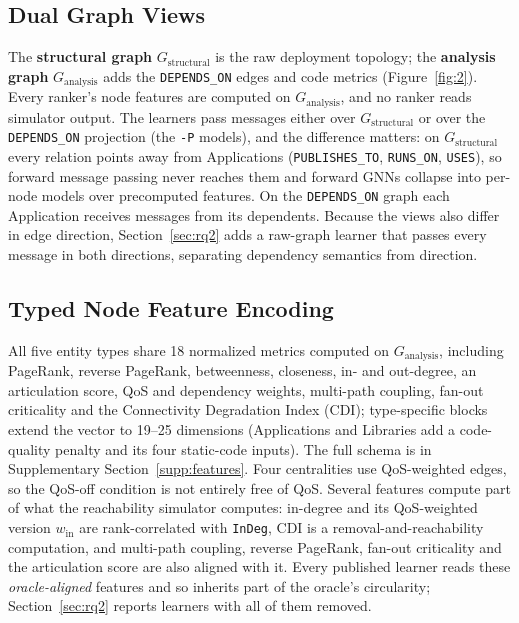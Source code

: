 \subsection{Dual Graph Views}
\label{sec:3.4}

The \textbf{structural graph} $G_{\text{structural}}$ is the raw deployment topology; the \textbf{analysis graph} $G_{\text{analysis}}$ adds the \texttt{DEPENDS\_ON} edges and code metrics (Figure~\ref{fig:2}). Every ranker's node features are computed on $G_{\text{analysis}}$, and no ranker reads simulator output. The learners pass messages either over $G_{\text{structural}}$ or over the \texttt{DEPENDS\_ON} projection (the \texttt{-P} models), and the difference matters: on $G_{\text{structural}}$ every relation points away from Applications (\texttt{PUBLISHES\_TO}, \texttt{RUNS\_ON}, \texttt{USES}), so forward message passing never reaches them and forward GNNs collapse into per-node models over precomputed features. On the \texttt{DEPENDS\_ON} graph each Application receives messages from its dependents. Because the views also differ in edge direction, Section~\ref{sec:rq2} adds a raw-graph learner that passes every message in both directions, separating dependency semantics from direction.

\subsection{Typed Node Feature Encoding}
\label{sec:3.5}

All five entity types share 18 normalized metrics computed on $G_{\text{analysis}}$, including PageRank, reverse PageRank, betweenness, closeness, in- and out-degree, an articulation score, QoS and dependency weights, multi-path coupling, fan-out criticality and the Connectivity Degradation Index (CDI); type-specific blocks extend the vector to 19--25 dimensions (Applications and Libraries add a code-quality penalty and its four static-code inputs). The full schema is in Supplementary Section~\ref{supp:features}. Four centralities use QoS-weighted edges, so the QoS-off condition is not entirely free of QoS. Several features compute part of what the reachability simulator computes: in-degree and its QoS-weighted version $w_{\text{in}}$ are rank-correlated with \texttt{InDeg}, CDI is a removal-and-reachability computation, and multi-path coupling, reverse PageRank, fan-out criticality and the articulation score are also aligned with it. Every published learner reads these \emph{oracle-aligned} features and so inherits part of the oracle's circularity; Section~\ref{sec:rq2} reports learners with all of them removed.
